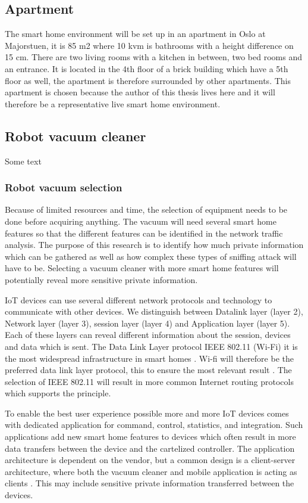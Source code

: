 \subsection{Apartment}
The smart home environment will be set up in an apartment in Oslo at Majorstuen, it is 85 m2 where 10 kvm is bathrooms with a height difference on 15 cm. There are two living rooms with a kitchen in between, two bed rooms and an entrance. It is located in the 4th floor of a brick building which have a 5th floor as well, the apartment is therefore surrounded by other apartments. This apartment is chosen because the author of this thesis lives here and it will therefore be a representative live smart home environment.  

\subsection{Robot vacuum cleaner}
Some text

\subsubsection{Robot vacuum selection}
Because of limited resources and time, the selection of equipment needs to be done before acquiring anything. The vacuum will need several smart home features so that the different features can be identified in the network traffic analysis. The purpose of this research is to identify how much private information which can be gathered as well as how complex these types of sniffing attack will have to be. Selecting a vacuum cleaner with more smart home features will potentially reveal more sensitive private information.

IoT devices can use several different network protocols and technology to communicate with other devices. We distinguish between Datalink layer (layer 2), Network layer (layer 3), session layer (layer 4) and Application layer (layer 5). Each of these layers can reveal different information about the session, devices and data which is sent. The Data Link Layer protocol IEEE 802.11 (Wi-Fi) it is the most widespread infrastructure in smart homes \cite{robotsel1}. Wi-fi will therefore be the preferred data link layer protocol, this to ensure the most relevant result \cite{robotsel2}\cite{robotsel3}. The selection of IEEE 802.11 will result in more common Internet routing protocols which supports the principle.

To enable the best user experience possible more and more IoT devices comes with dedicated application for command, control, statistics, and integration. Such applications add new smart home features to devices which often result in more data transfers between the device and the cartelized controller. The application architecture is dependent on the vendor, but a common design is a client-server architecture, where both the vacuum cleaner and mobile application is acting as clients \cite{robotsel4}. This may include sensitive private information transferred between the devices.


